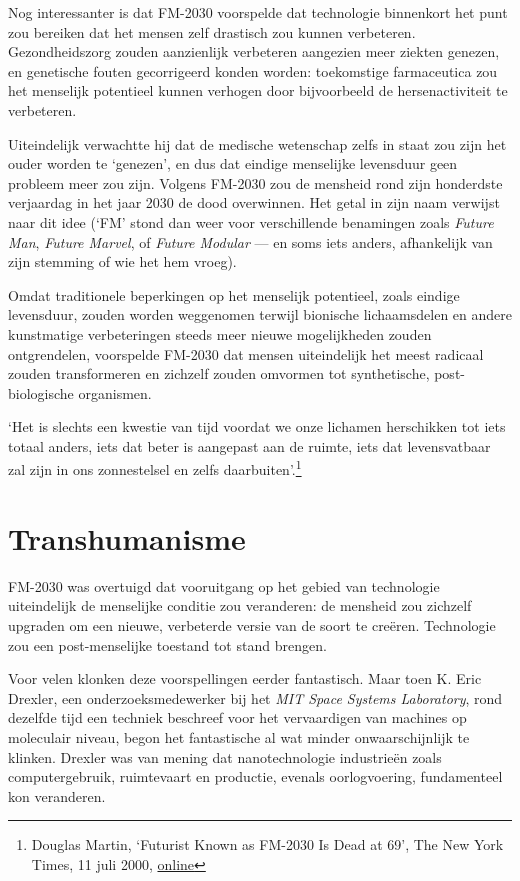 \documentclass[smalldemyvopaper,11pt,twoside,onecolumn,openright,extrafontsizes,hidelinks]{memoir}
\begin{document}
Nog interessanter is dat FM-2030 voorspelde dat technologie binnenkort
het punt zou bereiken dat het mensen zelf drastisch zou kunnen
verbeteren. Gezondheidszorg zouden aanzienlijk verbeteren aangezien meer
ziekten genezen, en genetische fouten gecorrigeerd konden worden:
toekomstige farmaceutica zou het menselijk potentieel kunnen verhogen
door bijvoorbeeld de hersenactiviteit te verbeteren.

Uiteindelijk verwachtte hij dat de medische wetenschap zelfs in staat
zou zijn het ouder worden te `genezen', en dus dat eindige menselijke
levensduur geen probleem meer zou zijn. Volgens FM-2030 zou de mensheid
rond zijn honderdste verjaardag in het jaar 2030 de dood overwinnen. Het
getal in zijn naam verwijst naar dit idee (`FM' stond dan weer voor
verschillende benamingen zoals \emph{Future Man}, \emph{Future Marvel},
of \emph{Future Modular} --- en soms iets anders, afhankelijk van zijn
stemming of wie het hem vroeg).

Omdat traditionele beperkingen op het menselijk potentieel, zoals
eindige levensduur, zouden worden weggenomen terwijl bionische
lichaamsdelen en andere kunstmatige verbeteringen steeds meer nieuwe
mogelijkheden zouden ontgrendelen, voorspelde FM-2030 dat mensen
uiteindelijk het meest radicaal zouden transformeren en zichzelf zouden
omvormen tot synthetische, post-biologische organismen.

`Het is slechts een kwestie van tijd voordat we onze lichamen
herschikken tot iets totaal anders, iets dat beter is aangepast aan de
ruimte, iets dat levensvatbaar zal zijn in ons zonnestelsel en zelfs
daarbuiten'.\footnote{Douglas Martin, `Futurist Known as FM-2030 Is Dead
  at 69', The New York Times, 11 juli 2000,
  \href{https://www.nytimes.com/2000/07/11/us/futurist-known-as-fm-2030-is-dead-at-69.html}{online}}

\section{Transhumanisme}\label{transhumanisme}

FM-2030 was overtuigd dat vooruitgang op het gebied van technologie
uiteindelijk de menselijke conditie zou veranderen: de mensheid zou
zichzelf upgraden om een nieuwe, verbeterde versie van de soort te
creëren. Technologie zou een post-menselijke toestand tot stand brengen.

Voor velen klonken deze voorspellingen eerder fantastisch. Maar toen K.
Eric Drexler, een onderzoeksmedewerker bij het \emph{MIT Space Systems
Laboratory}, rond dezelfde tijd een techniek beschreef voor het
vervaardigen van machines op moleculair niveau, begon het fantastische
al wat minder onwaarschijnlijk te klinken. Drexler was van mening dat
nanotechnologie industrieën zoals computergebruik, ruimtevaart en
productie, evenals oorlogvoering, fundamenteel kon veranderen.
\end{document}
